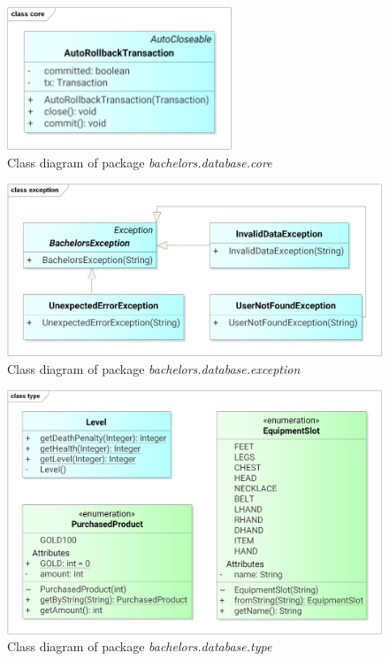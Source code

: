 \begin{figure}[h]	
	\includegraphics[width=0.6\textwidth]{figures/classdiagrams/dscore}
	\centering			
	\caption{Class diagram of package \textit{bachelors.database.core}}
\end{figure}

\begin{figure}[h]	
	\includegraphics[width=\textwidth]{figures/classdiagrams/dsexception}
	\centering			
	\caption{Class diagram of package \textit{bachelors.database.exception}}
\end{figure}

\begin{figure}[h]	
	\includegraphics[width=\textwidth]{figures/classdiagrams/dstype}
	\centering			
	\caption{Class diagram of package \textit{bachelors.database.type}}
\end{figure}


